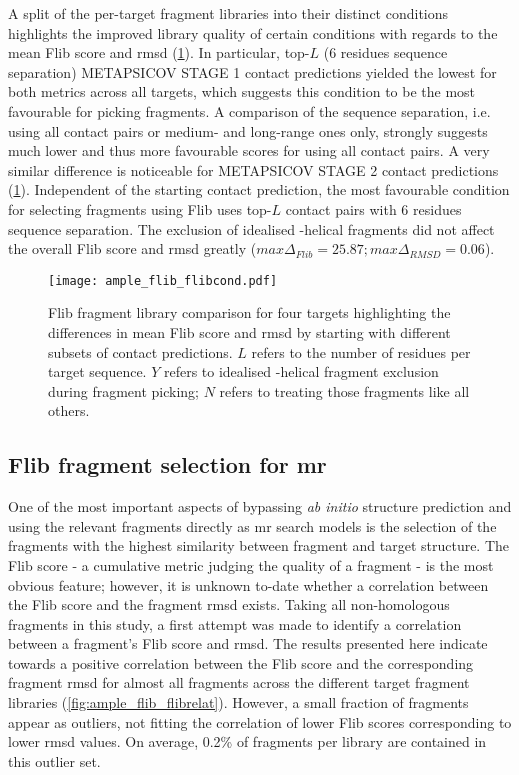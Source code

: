 A split of the per-target fragment libraries into their distinct conditions highlights the improved library quality of certain conditions with regards to the mean Flib score and \gls{rmsd} (\cref{fig:ample_flib_flibcond}). In particular, top-$L$ (6 residues sequence separation) METAPSICOV STAGE 1 contact predictions yielded the lowest for both metrics across all targets, which suggests this condition to be the most favourable for picking fragments. A comparison of the sequence separation, i.e. using all contact pairs or medium- and long-range ones only, strongly suggests much lower and thus more favourable scores for using all contact pairs. A very similar difference is noticeable for METAPSICOV STAGE 2 contact predictions (\cref{fig:ample_flib_flibcond}). Independent of the starting contact prediction, the most favourable condition for selecting fragments using Flib uses top-$L$ contact pairs with 6 residues sequence separation. The exclusion of idealised \textalpha-helical fragments did not affect the overall Flib score and \gls{rmsd} greatly ($max \Delta_{Flib}=25.87; max \Delta_{RMSD}=0.06$).

\begin{figure}[H]
	\centering
	\texttt{[image: ample\_flib\_flibcond.pdf]}
	\caption[Flib fragment library comparison]{Flib fragment library comparison for four targets highlighting the differences in mean Flib score and \gls{rmsd} by starting with different subsets of contact predictions. $L$ refers to the number of residues per target sequence. $Y$ refers to idealised \textalpha-helical fragment exclusion during fragment picking; $N$ refers to treating those fragments like all others.}
	\label{fig:ample_flib_flibcond}
\end{figure}

\subsection{Flib fragment selection for \acrlong{mr}}

One of the most important aspects of bypassing \textit{ab initio} structure prediction and using the relevant fragments directly as \gls{mr} search models is the selection of the fragments with the highest similarity between fragment and target structure. The Flib score - a cumulative metric judging the quality of a fragment - is the most obvious feature; however, it is unknown to-date whether a correlation between the Flib score and the fragment \gls{rmsd} exists. Taking all non-homologous fragments in this study, a first attempt was made to identify a correlation between a fragment's Flib score and \gls{rmsd}. The results presented here indicate towards a positive correlation between the Flib score and the corresponding fragment \gls{rmsd} for almost all fragments across the different target fragment libraries (\cref{fig:ample_flib_flibrelat}). However, a small fraction of fragments appear as outliers, not fitting the correlation of lower Flib scores corresponding to lower \gls{rmsd} values. On average, 0.2\% of fragments per library are contained in this outlier set.

